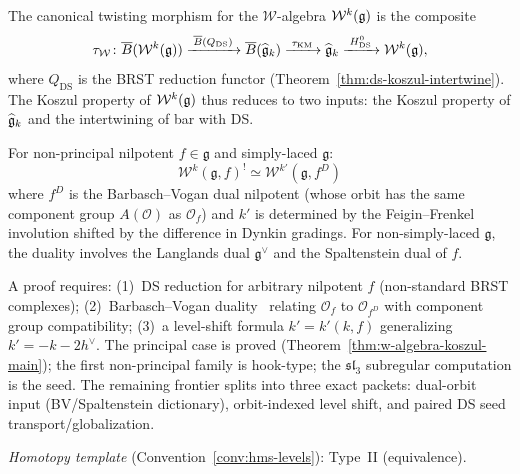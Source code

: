 \begin{remark}
\label{rem:w-twisting-morphism}
The canonical twisting morphism for the $\mathcal{W}$-algebra
$\mathcal{W}^k(\mathfrak{g})$ is the composite
\[
\tau_{\mathcal{W}} \colon
\overline{B}(\mathcal{W}^k(\mathfrak{g}))
\xrightarrow{\;\overline{B}(Q_{\mathrm{DS}})\;}
\overline{B}(\widehat{\mathfrak{g}}_k)
\xrightarrow{\;\tau_{\mathrm{KM}}\;}
\widehat{\mathfrak{g}}_k
\xrightarrow{\;H^0_{\mathrm{DS}}\;}
\mathcal{W}^k(\mathfrak{g}),
\]
where $Q_{\mathrm{DS}}$ is the BRST reduction functor
(Theorem~\ref{thm:ds-koszul-intertwine}).  The Koszul property
of $\mathcal{W}^k(\mathfrak{g})$ thus reduces to two inputs: the Koszul
property of $\widehat{\mathfrak{g}}_k$ and the intertwining of bar with DS.
\end{remark}

\begin{conjecture}\label{conj:w-orbit-duality}
For non-principal nilpotent $f \in \mathfrak{g}$ and simply-laced $\mathfrak{g}$:
\begin{equation}
\mathcal{W}^k(\mathfrak{g}, f)^! \simeq \mathcal{W}^{k'}(\mathfrak{g}, f^D)
\end{equation}
where $f^D$ is the Barbasch--Vogan dual nilpotent (whose orbit has the same component group $A(\mathcal{O})$ as $\mathcal{O}_f$) and $k'$ is determined by the Feigin--Frenkel involution shifted by the difference in Dynkin gradings.  For non-simply-laced $\mathfrak{g}$, the duality involves the Langlands dual $\mathfrak{g}^\vee$ and the Spaltenstein dual of $f$.
\end{conjecture}

\begin{remark}[Scope]
A proof requires: (1)~DS reduction for arbitrary nilpotent $f$ (non-standard BRST complexes); (2)~Barbasch--Vogan duality~\cite{BV85} relating $\mathcal{O}_f$ to $\mathcal{O}_{f^D}$ with component group compatibility; (3)~a level-shift formula $k' = k'(k,f)$ generalizing $k' = -k - 2h^\vee$.  The principal case is proved (Theorem~\ref{thm:w-algebra-koszul-main}); the first non-principal family is hook-type; the $\mathfrak{sl}_3$ subregular computation is the seed.  The remaining frontier splits into three exact packets: dual-orbit input (BV/Spaltenstein dictionary), orbit-indexed level shift, and paired DS seed transport/globalization.

\emph{Homotopy template} (Convention~\ref{conv:hms-levels}): Type~II (equivalence).
\end{remark}

